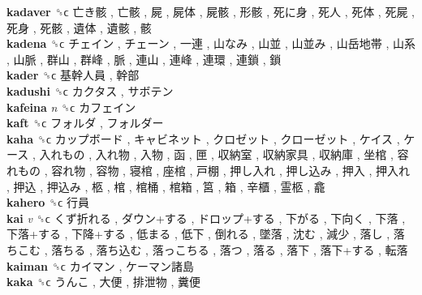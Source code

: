 \textbf{kadaver} ␝ϲ   亡き骸 ,  亡骸 ,  屍 ,  屍体 ,  屍骸 ,  形骸 ,  死に身 ,  死人 ,  死体 ,  死屍 ,  死身 ,  死骸 ,  遺体 ,  遺骸 ,  骸   \\
\textbf{kadena} ␝ϲ   チェイン ,  チェーン ,  一連 ,  山なみ ,  山並 ,  山並み ,  山岳地帯 ,  山系 ,  山脈 ,  群山 ,  群峰 ,  脈 ,  連山 ,  連峰 ,  連環 ,  連鎖 ,  鎖   \\
\textbf{kader} ␝ϲ   基幹人員 ,  幹部   \\
\textbf{kadushi} ␝ϲ   カクタス ,  サボテン   \\
\textbf{kafeina} \emph{n}  ␝ϲ   カフェイン   \\
\textbf{kaft} ␝ϲ   フォルダ ,  フォルダー   \\
\textbf{kaha} ␝ϲ   カップボード ,  キャビネット ,  クロゼット ,  クローゼット ,  ケイス ,  ケース ,  入れもの ,  入れ物 ,  入物 ,  函 ,  匣 ,  収納室 ,  収納家具 ,  収納庫 ,  坐棺 ,  容れもの ,  容れ物 ,  容物 ,  寝棺 ,  座棺 ,  戸棚 ,  押し入れ ,  押し込み ,  押入 ,  押入れ ,  押込 ,  押込み ,  柩 ,  棺 ,  棺桶 ,  棺箱 ,  筥 ,  箱 ,  辛櫃 ,  霊柩 ,  龕   \\
\textbf{kahero} ␝ϲ   行員   \\
\textbf{kai} \emph{v}  ␝ϲ   くず折れる ,  ダウン+する ,  ドロップ+する ,  下がる ,  下向く ,  下落 ,  下落+する ,  下降+する ,  低まる ,  低下 ,  倒れる ,  墜落 ,  沈む ,  減少 ,  落し ,  落ちこむ ,  落ちる ,  落ち込む ,  落っこちる ,  落つ ,  落る ,  落下 ,  落下+する ,  転落   \\
\textbf{kaiman} ␝ϲ   カイマン ,  ケーマン諸島   \\
\textbf{kaka} ␝ϲ   うんこ ,  大便 ,  排泄物 ,  糞便   \\

